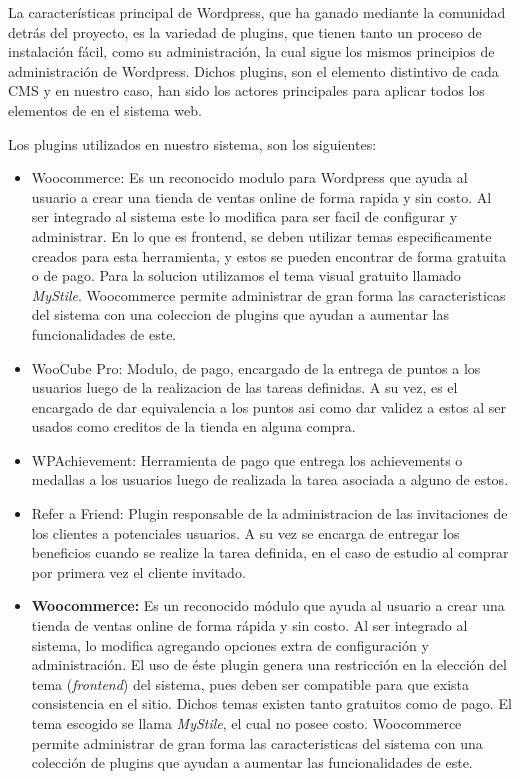 La características principal de Wordpress, que ha ganado mediante
la comunidad detrás del proyecto, es la variedad de plugins, que
tienen tanto un proceso de instalación fácil, como su administración,
la cual sigue los mismos principios de administración de Wordpress.
Dichos plugins, son el elemento distintivo de cada CMS
y en nuestro caso, han sido los actores principales para aplicar
todos los elementos de {\GAM} en el sistema web.

Los plugins utilizados en nuestro sistema, son los siguientes:

\begin{itemize}

\item Woocommerce: Es un reconocido modulo para Wordpress que ayuda al usuario a crear una tienda de ventas 
online de forma rapida y sin costo. Al ser integrado al sistema este lo modifica para ser facil de configurar
y administrar. En lo que es frontend, se deben utilizar temas especificamente creados para esta herramienta, y 
estos se pueden encontrar de forma gratuita o de pago. Para la solucion utilizamos el tema visual gratuito llamado
\emph{MyStile}. Woocommerce permite administrar de gran forma las caracteristicas del sistema con una coleccion
de plugins que ayudan a aumentar las funcionalidades de este. 

\item WooCube Pro: Modulo, de pago, encargado de la entrega de puntos a los usuarios luego de la 
realizacion de las tareas definidas. A su vez, es el encargado de dar equivalencia a los puntos asi como
dar validez a estos al ser usados como creditos de la tienda en alguna compra. 

\item WPAchievement: Herramienta de pago que entrega los achievements o medallas a los usuarios
luego de realizada la tarea asociada a alguno de estos.

\item Refer a Friend: Plugin responsable de la administracion de las invitaciones de los clientes a
potenciales usuarios. A su vez se encarga de entregar los beneficios cuando se realize la tarea
definida, en el caso de estudio al comprar por primera vez el cliente invitado.
\item {\bf Woocommerce:}
        Es un reconocido módulo que ayuda al usuario a crear una tienda de
        ventas online de forma rápida y sin costo.
        Al ser integrado al sistema, lo modifica agregando opciones
        extra de configuración y administración.
        El uso de éste plugin genera una restricción en la elección
        del tema (\emph{frontend}) del sistema, pues deben ser compatible
        para que exista consistencia en el sitio.
        Dichos temas existen tanto gratuitos como de pago.
        El tema escogido se llama \emph{MyStile}, el cual no posee costo.
        Woocommerce permite administrar de gran forma las caracteristicas del
        sistema con una colección de plugins que ayudan a aumentar las
        funcionalidades de este.


\end{itemize}
